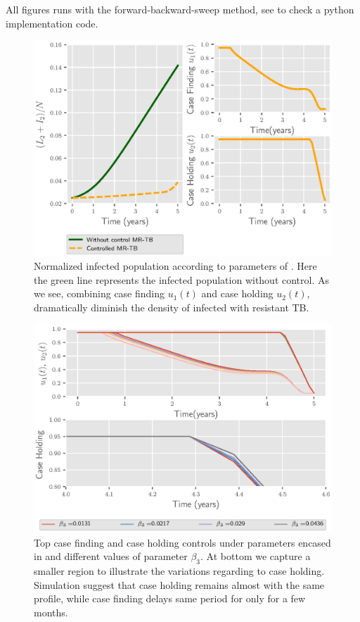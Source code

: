 All figures runs with the forward-backward-sweep method, see \cite{python_repo}
to check a python implementation code.
%
\begin{figure}[H]
  \centering
  \includegraphics{Figures/figure_1_two_strain_tbm}
  \caption{Normalized infected population according to parameters of 
  . Here the green line represents the 
  infected population without control. As we see, combining case finding 
  $u_1(t)$ and  case holding $u_2(t)$, dramatically diminish the density of 
  infected with resistant TB.}
  \label{fig:figure1twostraintbm}
\end{figure}
%
\begin{figure}[H]
  \centering
  \includegraphics{Figures/figure_2_two_strain_tbm}
  \caption{
    Top case finding and case holding controls 
    under parameters encased in  and
    different values of parameter $\beta_3$. At bottom we capture a smaller
    region to illustrate the variations regarding to case holding. Simulation 
    suggest 
    that case holding remains almost with the same profile, while case finding 
    delays same period for only for a few months.
  }\label{fig:figure2twostraintbm}
\end{figure}
